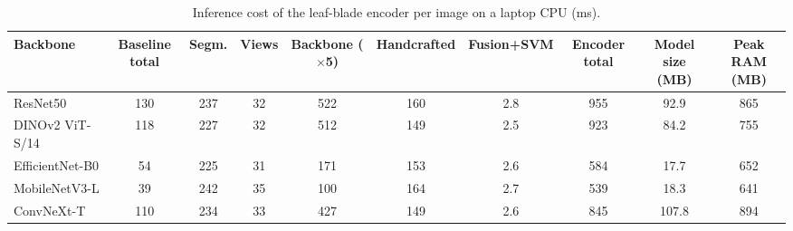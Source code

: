 \begin{table}[tbp]
\centering
\footnotesize
\caption{Inference cost of the leaf-blade encoder per image on a laptop CPU (ms).}
\label{tab:efficiency}
\begin{adjustbox}{max width=\textwidth}
\begin{tabular}{lccccccccc}
\toprule
Backbone & Baseline total & Segm. & Views & Backbone ($\times$5) & Handcrafted & Fusion+SVM & Encoder total & Model size (MB) & Peak RAM (MB) \\
\midrule
ResNet50 & 130 & 237 & 32 & 522 & 160 & 2.8 & 955 & 92.9 & 865 \\
DINOv2 ViT-S/14 & 118 & 227 & 32 & 512 & 149 & 2.5 & 923 & 84.2 & 755 \\
EfficientNet-B0 & 54 & 225 & 31 & 171 & 153 & 2.6 & 584 & 17.7 & 652 \\
MobileNetV3-L & 39 & 242 & 35 & 100 & 164 & 2.7 & 539 & 18.3 & 641 \\
ConvNeXt-T & 110 & 234 & 33 & 427 & 149 & 2.6 & 845 & 107.8 & 894 \\
\bottomrule
\end{tabular}
\end{adjustbox}
\end{table}

